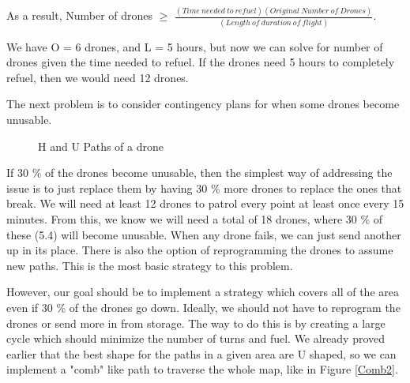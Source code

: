 \documentclass{article}
\begin{document}
As a result, Number of drones $\geq$ $\frac{(Time~needed~to~refuel)(Original~Number~of~Drones)}{(Length~of~duration~of~flight)}$. 

We have O = 6 drones, and L = 5 hours, but now we can solve for number of drones given the time needed to refuel. If the drones need 5 hours to completely refuel, then we would need 12 drones. 

The next problem is to consider contingency plans for when some drones become unusable. 

\begin{figure}%
    \centering
    \qquad
    \caption{H and U Paths of a drone}%
    \label{Paths}%
\end{figure} 

If 30 \% of the drones become unusable, then the simplest way of addressing the issue is to just replace them by having 30 \% more drones to replace the ones that break. We will need at least 12 drones to patrol every point at least once every 15 minutes. From this, we know we will need a total of 18 drones, where 30 \% of these (5.4) will become unusable. When any drone fails, we can just send another up in its place. There is also the option of reprogramming the drones to assume new paths. This is the most basic strategy to this problem. 

However, our goal should be to implement a strategy which covers all of the area even if 30 \% of the drones go down. Ideally, we should not have to reprogram the drones or send more in from storage. The way to do this is by creating a large cycle which should minimize the number of turns and fuel. We already proved earlier that the best shape for the paths in a given area are U shaped, so we can implement a "comb" like path to traverse the whole map, like in Figure \ref{Comb2}. 
\end{document}
